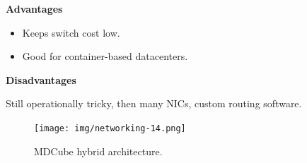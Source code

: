 \highspace
\begin{flushleft}
    \textcolor{Green3}{ \textbf{Advantages}}
\end{flushleft}
\begin{itemize}
    \item Keeps switch cost low.
    \item Good for container-based datacenters.
\end{itemize}

\highspace
\begin{flushleft}
    \textcolor{Red2}{ \textbf{Disadvantages}}
\end{flushleft}
Still operationally tricky, then many NICs, custom routing software.

\begin{figure}[!htp]
    \centering
    \texttt{[image: img/networking-14.png]}
    \caption{MDCube hybrid architecture.}
\end{figure}